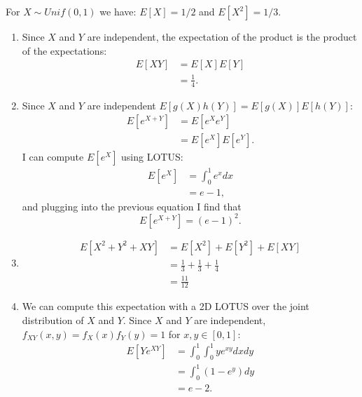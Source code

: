 \begin{problem}{26} For $X \sim Unif(0,1)$ we have: $E[X]=1/2$ and $E[X^2]=1/3$. 
\begin{enumerate}

\item Since $X$ and $Y$ are independent, the expectation of the product is the product of the expectations:
\begin{align*}
E[XY] &= E[X]E[Y] \\
& = \frac{1}{4}.
\end{align*}

\item Since $X$ and $Y$ are independent $E[g(X)h(Y)]=E[g(X)]E[h(Y)]$:
\begin{align*}
E[e^{X+Y}] &= E\left [e^Xe^Y \right] \\
&= E\left [e^X \right ]E\left [e^Y \right]. 
\end{align*}
I can compute $E[e^X]$ using LOTUS:
\begin{align*}
E\left[e^{X}\right] &= \int_0^1 e^x dx \\
& = e-1,
\end{align*}
and plugging into the previous equation I find that
\begin{equation*}
E\left[e^{X+Y}\right] = (e-1)^2.
\end{equation*}

\item 
\begin{align*}
E[X^2+Y^2+XY] &= E[X^2]+E[Y^2]+E[XY] \\
& = \frac{1}{3}+\frac{1}{3}+\frac{1}{4} \\
& = \frac{11}{12}
\end{align*}

\item We can compute this expectation with a 2D LOTUS over the joint distribution of $X$ and $Y$.  Since $X$ and $Y$ are independent, $f_{XY}(x,y) = f_X(x)f_Y(y) = 1$ for $x, y \in [0, 1]$:
\begin{align*}
E[Ye^{XY}] &= \int_0^1 \int_0^1 y e^{xy} dxdy \\
&= \int_0^1 \left (1-e^y \right) dy \\
&= e-2.
\end{align*}

\end{enumerate}
\end{problem}

